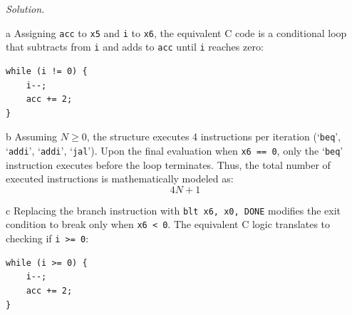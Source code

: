 \documentclass[11pt]{article}
\newenvironment{solution}{\par\noindent\textit{Solution.}}{\par\vspace{1em}}
\begin{document}
\begin{solution}
    \begin{subproblem}{a}
        Assigning \texttt{acc} to \texttt{x5} and \texttt{i} to \texttt{x6}, the equivalent C code is a conditional loop that subtracts from \texttt{i} and adds to \texttt{acc} until \texttt{i} reaches zero:
        \begin{verbatim}
while (i != 0) {
    i--;
    acc += 2;
}
        \end{verbatim}
    \end{subproblem}

    \begin{subproblem}{b}
        Assuming $N \ge 0$, the structure executes 4 instructions per iteration (`\texttt{beq}', `\texttt{addi}', `\texttt{addi}', `\texttt{jal}'). Upon the final evaluation when \texttt{x6 == 0}, only the `\texttt{beq}' instruction executes before the loop terminates.
        Thus, the total number of executed instructions is mathematically modeled as:
        \[ 4N + 1 \]
    \end{subproblem}

    \begin{subproblem}{c}
        Replacing the branch instruction with \texttt{blt x6, x0, DONE} modifies the exit condition to break only when \texttt{x6 < 0}. The equivalent C logic translates to checking if \texttt{i >= 0}:
        \begin{verbatim}
while (i >= 0) {
    i--;
    acc += 2;
}
        \end{verbatim}
    \end{subproblem}
\end{solution}
\end{document}

